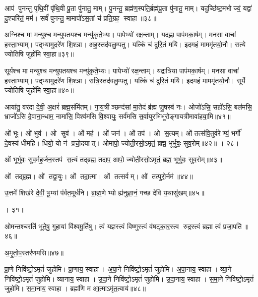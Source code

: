 आप॑ पुनन्तु पृथि॒वीं पृ॑थि॒वी पू॒ता पु॑नातु॒ माम्। पु॒नन्तु॒ ब्रह्म॑ण॒स्पति॒र्ब्रह्म॑पू॒ता पु॑नातु॒ माम्। यदुच्छि॑ष्ट॒मभोज्यं॒ यद्वा॑ दु॒श्चरि॑तं॒ मम॑। सर्वं॑ पुनन्तु॒ मामापो॑ऽस॒तां च॑ प्रति॒ग्रह॒ स्वाहा॥३८॥
\anuvakamend


अग्निश्च मा मन्युश्च मन्युपतयश्च मन्यु॑कृते॒भ्यः। पापेभ्यो॑ रक्ष॒न्ताम्। यदह्ना पाप॑मका॒र्\mbox{}षम्। मनसा वाचा॑ हस्ता॒भ्याम्। पद्भ्यामुदरे॑ण शि॒श्ञा। अह॒स्तद॑वलु॒म्पतु। यत्किं च॑ दुरि॒तं मयि॑। इदमहं माममृ॑तयो॒नौ। सत्ये ज्योतिषि जुहो॑मि स्वा॒हा॥३९॥
\anuvakamend


सूर्यश्च मा मन्युश्च मन्युपतयश्च मन्यु॑कृते॒भ्यः। पापेभ्यो॑ रक्ष॒न्ताम्। यद्रात्रिया पाप॑मका॒र्\mbox{}षम्। मनसा वाचा॑ हस्ता॒भ्याम्। पद्भ्यामुदरे॑ण शि॒श्ञा। रात्रि॒स्तद॑वलु॒म्पतु। यत्किं च॑ दुरि॒तं मयि॑। इदमहं माममृ॑तयो॒नौ। सूर्ये ज्योतिषि जुहो॑मि स्वा॒हा॥४०॥
\anuvakamend


आया॑तु॒ वर॑दा दे॒वी॒ अ॒क्षरं॑ ब्रह्म॒संमि॑तम्। गा॒य॒त्रीञ्छन्द॑सां मा॒तेदं ब्र॑ह्म जु॒षस्व॑ नः। ओजो॑ऽसि॒ सहो॑ऽसि॒ बल॑मसि॒ भ्राजो॑ऽसि दे॒वाना॒न्धाम॒ नामा॑सि॒ विश्व॑मसि वि॒श्वायुः॒ सर्व॑मसि स॒र्वायुरभिभूरोङ्गायत्रीमावा॑हया॒मि॥४१॥
\anuvakamend


ओं भूः। ओं भुव॑। ओ सुव॑। ओं मह॑। ओं जन॑। ओं तप॑। ओ स॒त्यम्। ओं तत्स॑वि॒तुर्वरेण्यं॒ भर्गो॑ दे॒वस्य॑ धीमहि। धियो॒ यो न॑ प्रचो॒दयात्। ओमापो॒ ज्योती॒रसो॒ऽमृतं॒ ब्रह्म॒ भूर्भुवः॒ सुव॒रोम्॥४२॥
। २८।
\anuvakamend


ओं भूर्भुवः॒ सुव॒र्मह॒र्जन॒स्तप॑ स॒त्यं तद्ब्रह्म॒ तदाप॒ आपो॒ ज्योती॒रसो॒ऽमृतं॒ ब्रह्म॒ भूर्भुवः॒ सुव॒रोम्॥४३॥
\anuvakamend


ओं तद्ब्र॒ह्म। ओं तद्वा॒युः। ओं तदा॒त्मा। ओं तत्सर्वम्। ओं तत्पुरो॒र्नम॑॥४४॥

उ॒त्तमे॑ शिख॑रे दे॒वी॒ भू॒म्यां प॑र्वत॒मूर्ध॑नि। ब्रा॒ह्म॒णेभ्यो ह्य॑नुज्ञा॒नं॒ गच्छ दे॑वि य॒थासु॑खम्॥४५॥
\anuvakamend


। ३१।

ओमन्तश्चरति॑ भूते॒षु॒ गुहायां वि॑श्वमू॒र्तिषु। त्वं यज्ञस्त्वं  विष्णुस्त्वं व॑षट्का॒र॒स्त्व रुद्रस्त्वं ब्रह्मा त्वं॑ प्रजा॒पति॑॥४६॥
\anuvakamend


अ॒मृ॒तो॒प॒स्तर॑णमसि॥४७॥
\anuvakamend


प्रा॒णे निवि॑ष्टो॒ऽमृतं॑ जुहोमि। प्रा॒णाय॒ स्वाहा। अ॒पा॒ने निवि॑ष्टो॒ऽमृतं॑ जुहोमि। अ॒पा॒नाय॒ स्वाहा। व्या॒ने निवि॑ष्टो॒ऽमृतं॑ जुहोमि। व्यानाय॒ स्वाहा। उ॒दा॒ने निवि॑ष्टो॒ऽमृतं॑ जुहोमि। उ॒दा॒नाय॒ स्वाहा। स॒मा॒ने निवि॑ष्टो॒ऽमृतं॑ जुहोमि। स॒मा॒नाय॒ स्वाहा। ब्रह्म॑णि म आ॒त्माऽमृ॑त॒त्वाय॑॥४८॥
\anuvakamend



